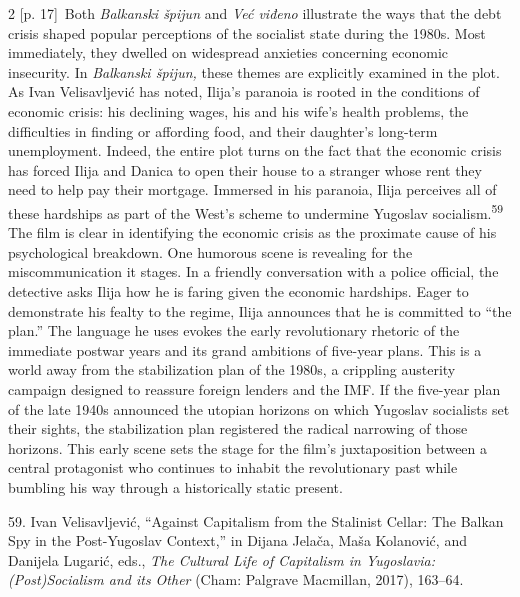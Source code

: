 \documentclass[10pt,a4paper]{article}
\begin{document}
\begin{paracol}{2}
\switchcolumn
{\scriptsize\color{gray} [p. 17]}\ Both \textit{Balkanski špijun} and \textit{Već viđeno} illustrate the ways that the debt crisis shaped popular perceptions of the socialist state during the 1980s. Most immediately, they dwelled on widespread anxieties concerning economic insecurity. In \textit{Balkanski špijun,} these themes are explicitly examined in the plot. As Ivan Velisavljević has noted, Ilija’s paranoia is rooted in the conditions of economic crisis: his declining wages, his and his wife’s health problems, the difficulties in finding or affording food, and their daughter’s long-term unemployment. Indeed, the entire plot turns on the fact that the economic crisis has forced Ilija and Danica to open their house to a stranger whose rent they need to help pay their mortgage. Immersed in his paranoia, Ilija perceives all of these hardships as part of the West’s scheme to undermine Yugoslav socialism.\nobreak\textsuperscript{59} The film is clear in identifying the economic crisis as the proximate cause of his psychological breakdown. One humorous scene is revealing for the miscommunication it stages. In a friendly conversation with a police official, the detective asks Ilija how he is faring given the economic hardships. Eager to demonstrate his fealty to the regime, Ilija announces that he is committed to “the plan.” The language he uses evokes the early revolutionary rhetoric of the immediate postwar years and its grand ambitions of five-year plans. This is a world away from the stabilization plan of the 1980s, a crippling austerity campaign designed to reassure foreign lenders and the IMF. If the five-year plan of the late 1940s announced the utopian horizons on which Yugoslav socialists set their sights, the stabilization plan registered the radical narrowing of those horizons. This early scene sets the stage for the film’s juxtaposition between a central protagonist who continues to inhabit the revolutionary past while bumbling his way through a historically static present.\par{\small 59. Ivan Velisavljević, “Against Capitalism from the Stalinist Cellar: The Balkan Spy in the Post-Yugoslav Context,” in Dijana Jelača, Maša Kolanović, and Danijela Lugarić, eds., \textit{The Cultural Life of Capitalism in Yugoslavia: (Post)Socialism and its Other} (Cham: Palgrave Macmillan, 2017), 163–64.\par}
\switchcolumn*

\end{paracol}
\end{document}
